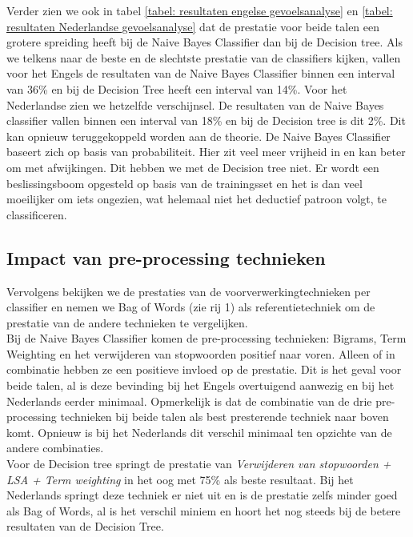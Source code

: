 Verder zien we ook in tabel \ref{tabel: resultaten engelse gevoelsanalyse} en \ref{tabel: resultaten Nederlandse gevoelsanalyse} dat de prestatie voor beide talen een grotere spreiding heeft bij de Naive Bayes Classifier dan bij de Decision tree. Als we telkens naar de beste en de slechtste prestatie van de classifiers kijken, vallen voor het Engels de resultaten van de Naive Bayes Classifier binnen een interval van 36\% en bij de Decision Tree heeft een interval van 14\%. Voor het Nederlandse zien we hetzelfde verschijnsel. De resultaten van de Naive Bayes classifier vallen binnen een interval van 18\% en bij de Decision tree is dit 2\%. Dit kan opnieuw teruggekoppeld worden aan de theorie. De Naive Bayes Classifier baseert zich op basis van probabiliteit. Hier zit veel meer vrijheid in en kan beter om met afwijkingen. Dit hebben we met de Decision tree niet. Er wordt een beslissingsboom opgesteld op basis van de trainingsset en het is dan veel moeilijker om iets ongezien, wat helemaal niet het deductief patroon volgt, te classificeren.\\

\subsection{Impact van pre-processing technieken}

Vervolgens bekijken we de prestaties van de voorverwerkingtechnieken per classifier en nemen we Bag of Words (zie rij 1) als referentietechniek om de prestatie van de andere technieken te vergelijken.\\
Bij de Naive Bayes Classifier komen de pre-processing technieken: Bigrams, Term Weighting en het verwijderen van stopwoorden positief naar voren. Alleen of in combinatie hebben ze een positieve invloed op de prestatie. Dit is het geval voor beide talen, al is deze bevinding bij het Engels overtuigend aanwezig en bij het Nederlands eerder minimaal. Opmerkelijk is dat de combinatie van de drie pre-processing technieken bij beide talen als best presterende techniek naar boven komt. Opnieuw is bij het Nederlands dit verschil minimaal ten opzichte van de andere combinaties.\\
Voor de Decision tree springt de prestatie van \textit{Verwijderen van stopwoorden + LSA + Term weighting} in het oog met 75\% als beste resultaat. Bij het Nederlands springt deze techniek er niet uit en is de prestatie zelfs minder goed als Bag of Words, al is het verschil miniem en hoort het nog steeds bij de betere resultaten van de Decision Tree.\\

